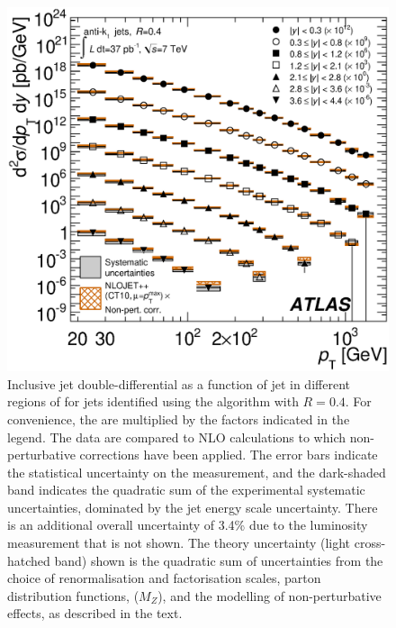 \begin{figure}
  \includegraphics[width=\largefigwidth]{chapters/forward-inclusive/InclusivePtIDS_CT10_AntiKt04.eps}
  \caption{Inclusive jet double-differential \xs as a function of jet \pT in
     different regions of \absRap for jets identified using the \akt algorithm with
     $R=0.4$. For convenience, the  are multiplied by the factors indicated
     in the legend. The data are compared to NLO \pQCD calculations to which non-perturbative
     corrections have been applied. The error bars indicate the statistical uncertainty
     on the measurement, and the dark-shaded band indicates the quadratic sum of the
     experimental systematic uncertainties, dominated by the jet energy scale uncertainty.
     There is an additional overall uncertainty of 3.4\% due to the luminosity measurement
     that is not shown. The theory uncertainty (light cross-hatched band) shown is the quadratic
     sum of uncertainties from the choice of renormalisation and factorisation scales,
     parton distribution functions, \alphaS($M_Z$), and the modelling of non-perturbative
     effects, as described in the text.}
  \label{fig:forward-inclusive:InclusiveCrossSectionAKT4}
\end{figure}

